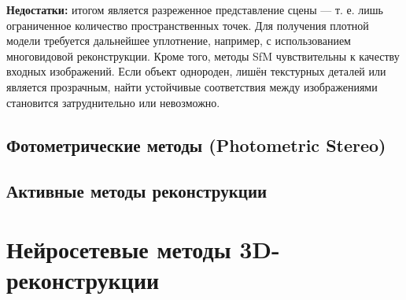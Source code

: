 \textbf{Недостатки:} итогом является разреженное представление сцены — т. е.
лишь ограниченное количество пространственных точек. Для получения плотной модели
требуется дальнейшее уплотнение, например, с использованием многовидовой
реконструкции. Кроме того, методы SfM чувствительны к качеству входных
изображений. Если объект однороден, лишён текстурных деталей или является
прозрачным, найти устойчивые соответствия между изображениями становится
затруднительно или невозможно.

\subsection{Фотометрические методы (Photometric Stereo)}
\subsection{Активные методы реконструкции}

\section{Нейросетевые методы 3D-реконструкции}

